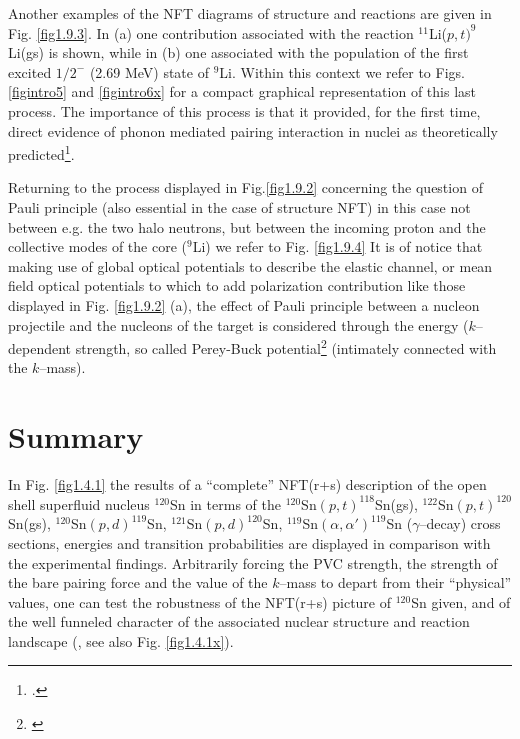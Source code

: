Another examples of the NFT diagrams of structure and reactions are given in Fig. \ref{fig1.9.3}. In (a) one contribution associated with the reaction $^{11}$Li($p,t)^9$Li(gs) is shown, while in (b) one associated with the population of the first excited $1/2^-$ (2.69 MeV) state of $^9$Li. Within this context we refer to Figs. \ref{figintro5} and \ref{figintro6x}   for a compact graphical representation of this last process. The importance of this process is that it provided, for the first time, direct evidence of phonon mediated pairing interaction in nuclei as theoretically predicted\footnote{\cite{Barranco:01} \cite{Tanihata:08,Potel:10,Tanihata:13,Beceiro:15}.}.

          Returning to the process displayed in Fig.\ref{fig1.9.2} concerning the question of Pauli principle (also essential in the case of structure NFT) in this case
          not between e.g. the two halo neutrons, but between the incoming proton and the collective modes
          of the core ($^9$Li) we refer to Fig. \ref{fig1.9.4} It is of notice that making use of global optical potentials to
          describe the elastic channel, or mean field optical potentials to which to add polarization contribution
          like those displayed in Fig. \ref{fig1.9.2} (a), the effect of Pauli principle between a nucleon projectile and the
          nucleons of the target is considered through the energy ($k$--dependent strength, so called Perey-Buck
          potential\footnote{\cite{Perey:62}} (intimately connected with the $k$--mass).
          \section{Summary}\label{C1S10}
In Fig. \ref{fig1.4.1} the results of a ``complete'' NFT(r+s) description of the open shell superfluid nucleus $^{120}$Sn in terms of the $^{120}$Sn$(p,t)^{118}$Sn(gs), $^{122}$Sn$(p,t)^{120}$Sn(gs), $^{120}$Sn$(p,d)^{119}$Sn, $^{121}$Sn$(p,d)^{120}$Sn, $^{119}$Sn$(\alpha,\alpha')^{119}$Sn ($\gamma$--decay) cross sections, energies and transition probabilities are displayed in comparison with the experimental findings. 
Arbitrarily forcing the PVC strength, the strength of the bare pairing force and the value of the $k$--mass to depart from their ``physical'' values, one can test the robustness  of the NFT(r+s) picture of $^{120}$Sn given, and of the well funneled character of the associated nuclear structure and reaction landscape (\cite{Idini:15}, see also Fig. \ref{fig1.4.1x}). 


